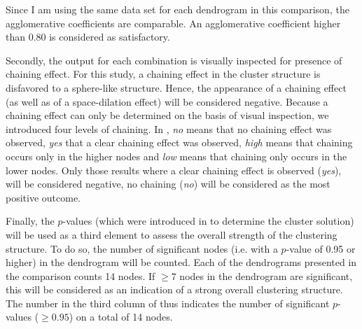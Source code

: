 Since I am using the same data set for each dendrogram in this comparison, the agglomerative coefficients are comparable. An agglomerative coefficient higher than 0.80 is considered as satisfactory.

Secondly, the output for each combination is visually inspected for presence of chaining effect. For this study, a chaining effect in the cluster structure is disfavored to a sphere-like structure. Hence, the appearance of a chaining effect (as well as of a space-dilation effect) will be considered negative. Because a chaining effect can only be determined on the basis of visual inspection, we introduced four levels of chaining. In , \textit{no} means that no chaining effect was observed, \textit{yes} that a clear chaining effect was observed, \textit{high} means that chaining occurs only in the higher nodes and \textit{low} means that chaining only occurs in the lower nodes. Only those results where a clear chaining effect is observed (\textit{yes}), will be considered negative, no chaining (\textit{no}) will be considered as the most positive outcome.

Finally, the $p$-values (which were introduced in  to determine the cluster solution) will be used as a third element to assess the overall strength of the clustering structure. To do so, the number of significant nodes (i.e. with a $p$-value of 0.95 or higher) in the dendrogram will be counted. Each of the dendrograms presented in the comparison counts 14 nodes. If $\geq 7$ nodes in the dendrogram are significant, this will be considered as an indication of a strong overall clustering structure. The number in the third column of  thus indicates the number of significant $p$-values ($\geq 0.95$) on a total of 14 nodes.

